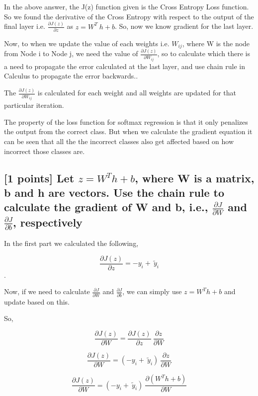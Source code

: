 In the above answer, the J(z) function given is the Cross Entropy Loss function. So we found the derivative of the Cross Entropy with respect to the output of the final layer i.e. $ \frac{\partial J(z)}{\partial z} $ as $ z = W^T \ h + b$. So, now we know gradient for the last layer. 

Now, to when we update the value of each weights i.e. $W_{ij}$, where W is the node from Node i to Node j, we need the value of $ \frac{\partial J(z)}{\partial W_{ij}} $, so to calculate which there is a need to propagate the error calculated at the last layer, and use chain rule in Calculus to propagate the error backwards.. 

The $ \frac{\partial J(z)}{\partial W_{ij}} $ is calculated for each weight and all weights are updated for that particular iteration. 

The property of the loss function for softmax regression is that it only penalizes the output from the correct class. But when we calculate the gradient equation it can be seen that all the the incorrect classes also get affected based on how incorrect those classes are. 

\subsection{ [1 points] Let $z = W^T h + b$, where W is a matrix, b and h are vectors. Use the
chain rule to calculate the gradient of W and b, i.e.,
$ \frac{\partial J}{\partial W} $ and $ \frac{\partial J}{\partial b} $, respectively}

In the first part we calculated the following, 

$$\frac{\partial J(z)}{\partial z} = -y_i + \ \widetilde{y}_i$$.

Now, if we need to calculate $ \frac{\partial J}{\partial W} $ and $ \frac{\partial J}{\partial b} $, we can simply use $z = W^T h + b$ and update based on this. 

So, 

$$ \frac{\partial J(z)}{\partial W}  =  \frac{\partial J(z)}{\partial z} \ \frac{\partial z}{\partial W} $$

$$ \frac{\partial J(z)}{\partial W}  =   (-y_i + \ \widetilde{y}_i)\ \frac{\partial z}{\partial W} $$

$$ \frac{\partial J(z)}{\partial W}  =   (-y_i + \ \widetilde{y}_i)\ \frac{\partial (W^T h + b)}{\partial W} $$


